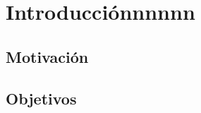 \renewcommand{\dir}{assets/images/capitulos}
\renewcommand{\nchapter}{0}



\chapter[Introducciónnnnnn]{Introducciónnnnnn}



\section{Motivación}


\section{Objetivos}


